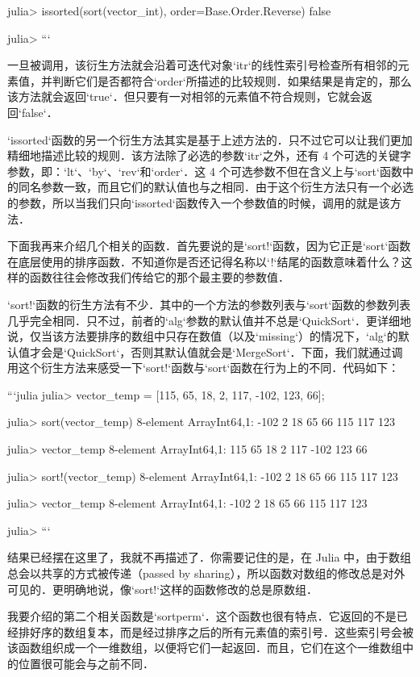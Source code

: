 julia> issorted(sort(vector_int), order=Base.Order.Reverse)
false

julia> 
```

一旦被调用，该衍生方法就会沿着可迭代对象`itr`的线性索引号检查所有相邻的元素值，并判断它们是否都符合`order`所描述的比较规则．如果结果是肯定的，那么该方法就会返回`true`．但只要有一对相邻的元素值不符合规则，它就会返回`false`．

`issorted`函数的另一个衍生方法其实是基于上述方法的．只不过它可以让我们更加精细地描述比较的规则．该方法除了必选的参数`itr`之外，还有 4 个可选的关键字参数，即：`lt`、`by`、`rev`和`order`．这 4 个可选参数不但在含义上与`sort`函数中的同名参数一致，而且它们的默认值也与之相同．由于这个衍生方法只有一个必选的参数，所以当我们只向`issorted`函数传入一个参数值的时候，调用的就是该方法．

下面我再来介绍几个相关的函数．首先要说的是`sort!`函数，因为它正是`sort`函数在底层使用的排序函数．不知道你是否还记得名称以`!`结尾的函数意味着什么？这样的函数往往会修改我们传给它的那个最主要的参数值．

`sort!`函数的衍生方法有不少．其中的一个方法的参数列表与`sort`函数的参数列表几乎完全相同．只不过，前者的`alg`参数的默认值并不总是`QuickSort`．更详细地说，仅当该方法要排序的数组中只存在数值（以及`missing`）的情况下，`alg`的默认值才会是`QuickSort`，否则其默认值就会是`MergeSort`．下面，我们就通过调用这个衍生方法来感受一下`sort!`函数与`sort`函数在行为上的不同．代码如下：

```julia
julia> vector_temp = [115, 65, 18, 2, 117, -102, 123, 66];

julia> sort(vector_temp)
8-element Array{Int64,1}:
 -102
    2
   18
   65
   66
  115
  117
  123

julia> vector_temp
8-element Array{Int64,1}:
  115
   65
   18
    2
  117
 -102
  123
   66

julia> sort!(vector_temp)
8-element Array{Int64,1}:
 -102
    2
   18
   65
   66
  115
  117
  123

julia> vector_temp
8-element Array{Int64,1}:
 -102
    2
   18
   65
   66
  115
  117
  123

julia> 
```

结果已经摆在这里了，我就不再描述了．你需要记住的是，在 Julia 中，由于数组总会以共享的方式被传递（passed by sharing），所以函数对数组的修改总是对外可见的．更明确地说，像`sort!`这样的函数修改的总是原数组．

我要介绍的第二个相关函数是`sortperm`．这个函数也很有特点．它返回的不是已经排好序的数组复本，而是经过排序之后的所有元素值的索引号．这些索引号会被该函数组织成一个一维数组，以便将它们一起返回．而且，它们在这个一维数组中的位置很可能会与之前不同．

